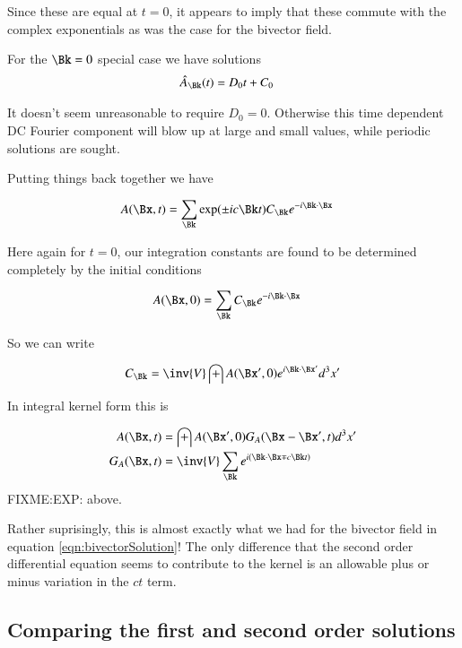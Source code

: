 \documentclass{article}
\begin{document}
Since these are equal at $t=0$, it appears to imply that these commute with the
complex exponentials as was the case for the bivector field.

For the $\Bk = 0$ special case we have solutions
\begin{align*}
\hat{A}_{\Bk}(t) &= D_0 t + C_0
\end{align*}

It doesn't seem unreasonable to require $D_0 = 0$.  Otherwise this time dependent DC Fourier component will blow up at large and small values, while periodic
solutions are sought.

Putting things back together we have 

\begin{align}
A(\Bx, t) &= \sum_{\Bk} 
\exp(\pm i c \Bk t) C_{\Bk} e^{ -i \Bk \cdot \Bx}
\end{align}

Here again for $t=0$, our integration constants are found to be determined completely by the initial conditions

\begin{align}
A(\Bx, 0) &= \sum_{\Bk} C_{\Bk} e^{ -i \Bk \cdot \Bx}
\end{align}

So we can write

\begin{align*}
C_{\Bk} = \inv{V} \int A(\Bx', 0) e^{ i \Bk \cdot \Bx'} d^3 x'
\end{align*}

In integral kernel form this is

\begin{align}
A(\Bx, t) &= \int A(\Bx', 0) G_A(\Bx - \Bx', t) d^3 x' \\
G_A(\Bx, t) &= \inv{V} \sum_{\Bk} e^{ i (\Bk \cdot \Bx \mp c \Bk t) }
\end{align}
FIXME:EXP: above.

Rather suprisingly, this is almost exactly what we had for the bivector field in equation \ref{eqn:bivectorSolution}!  The only difference that the second order differential equation seems to contribute to the kernel is an allowable plus or minus variation in the $ct$ term.

\subsection{ Comparing the first and second order solutions }
\end{document}
